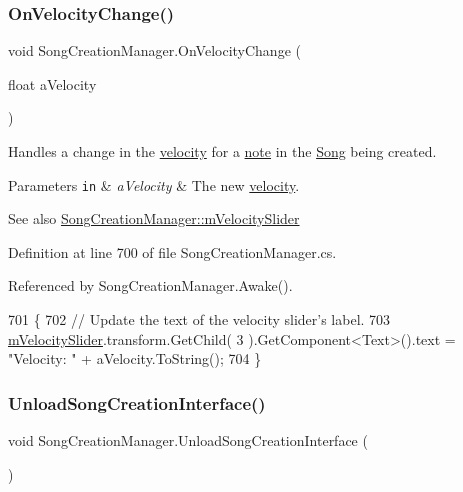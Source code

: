 \subsubsection{\texorpdfstring{On\+Velocity\+Change()}{OnVelocityChange()}}
{\footnotesize\ttfamily void Song\+Creation\+Manager.\+On\+Velocity\+Change (\begin{DoxyParamCaption}\item[{float}]{a\+Velocity }\end{DoxyParamCaption})}



Handles a change in the \hyperlink{group___audio_DefVel}{velocity} for a \hyperlink{group___music_structs_struct_music_1_1_combined_note}{note} in the \hyperlink{class_song}{Song} being created. 


\begin{DoxyParams}[1]{Parameters}
\mbox{\tt in}  & {\em a\+Velocity} & The new \hyperlink{group___audio_DefVel}{velocity}.\\
\hline
\end{DoxyParams}
\begin{DoxySeeAlso}{See also}
\hyperlink{group___s_c_m_priv_var_ga7316e5e8f15d1574fc6cb4bd739bbf0a}{Song\+Creation\+Manager\+::m\+Velocity\+Slider} 
\end{DoxySeeAlso}


Definition at line 700 of file Song\+Creation\+Manager.\+cs.



Referenced by Song\+Creation\+Manager.\+Awake().


\begin{DoxyCode}
701     \{
702         \textcolor{comment}{// Update the text of the velocity slider's label.}
703         \hyperlink{group___s_c_m_priv_var_ga7316e5e8f15d1574fc6cb4bd739bbf0a}{mVelocitySlider}.transform.GetChild( 3 ).GetComponent<Text>().text = \textcolor{stringliteral}{"Velocity: "} + 
      aVelocity.ToString();
704     \}
\end{DoxyCode}
\mbox{\label{group___s_c_m_handlers_gac39b0d849c680dda1e047c3e7d848b51}} 
\subsubsection{\texorpdfstring{Unload\+Song\+Creation\+Interface()}{UnloadSongCreationInterface()}}
{\footnotesize\ttfamily void Song\+Creation\+Manager.\+Unload\+Song\+Creation\+Interface (\begin{DoxyParamCaption}{ }\end{DoxyParamCaption})}



